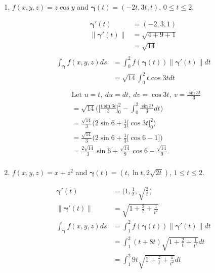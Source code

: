 \documentclass{article}
\newcommand{\norm}[1]{\| #1 \|}
\begin{document}
\begin{enumerate}
\begin{enumerate}
    \item $f(x,y,z) = z \cos y$ and $\boldsymbol{\gamma}(t) = (-2t,3t,t)$, $0\leq t \leq 2$.
    \begin{multicols}{2} 
    \noindent
    \begin{align*} 
        \boldsymbol{\gamma}'(t) &= (-2,3,1) \\
        \norm{\boldsymbol{\gamma}'(t)} &= \sqrt{4 + 9 + 1} \\
        &= \sqrt{14} \\
    \end{align*}
    \begin{align*} 
        \int_{\boldsymbol{\gamma}}f(x,y,z)ds &= \int_0^2 f(\boldsymbol{\gamma}(t)) \norm{\boldsymbol{\gamma}'(t)}dt \\
        &= \sqrt{14} \int_0^2 t \cos 3t dt \\
    \end{align*}
    \begin{align*} 
        &\text{Let } u = t,\: du = dt, \: dv = \cos 3t, \: v = \frac{\sin 3t}{3}\\
        &= \sqrt{14} \Big( \Big[ \frac{ t \sin 3t}{3} \Big]_0^2 - \int_0^2 \frac{ \sin 3t}{3} dt \Big) \\
        &= \frac{\sqrt{14}}{3} \Big( 2\sin 6 + \frac{1}{3}\Big[ \cos 3t \Big]_0^2 \Big) \\
        &= \frac{\sqrt{14}}{3} \Big( 2\sin 6 + \frac{1}{3}\Big[ \cos 6 - 1 \Big] \Big) \\
        &= \frac{2\sqrt{14}}{3}\sin 6 + \frac{\sqrt{14}}{9}\cos 6 -\frac{\sqrt{14}}{9} \\
    \end{align*}
    \end{multicols}
    \item $f(x,y,z) = x + z^2 $ and $\boldsymbol{\gamma}(t) = (t,\ln t, 2\sqrt{2t})$, $1\leq t \leq 2$.
    \begin{multicols}{2} 
    \begin{align*} 
        \boldsymbol{\gamma}'(t) &= \Big( 1,\frac{1}{t},\sqrt{\frac{2}{t}} \Big) \\
        \norm{\boldsymbol{\gamma}'(t)} &= \sqrt{1 + \frac{2}{t} + \frac{1}{t^2} } \\
        \int_{\boldsymbol{\gamma}}f(x,y,z)ds &= \int_1^2 f(\boldsymbol{\gamma}(t)) \norm{\boldsymbol{\gamma}'(t)}dt \\
        &= \int_1^2 (t + 8t) \sqrt{1 + \frac{2}{t} + \frac{1}{t^2} }dt \\
        &= \int_1^2 9t \sqrt{1 + \frac{2}{t} + \frac{1}{t^2} } dt \\

\end{align*}
\end{multicols}
\end{enumerate}
\end{enumerate}
\end{document}
